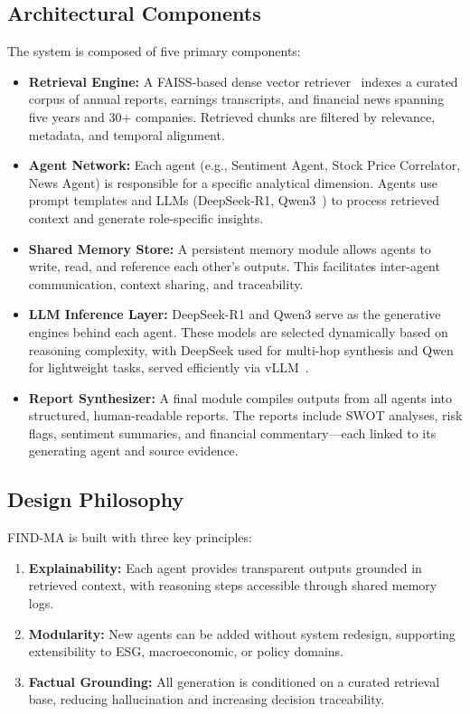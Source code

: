 \documentclass[11pt]{article}
\newcommand{\findma}{\textsc{FIND-MA}}
\begin{document}
\subsection*{Architectural Components}
The system is composed of five primary components:
\begin{itemize}
    \item \textbf{Retrieval Engine:} A FAISS-based dense vector retriever~\citep{johnson2017faiss} indexes a curated corpus of annual reports, earnings transcripts, and financial news spanning five years and 30+ companies. Retrieved chunks are filtered by relevance, metadata, and temporal alignment.
    \item \textbf{Agent Network:} Each agent (e.g., Sentiment Agent, Stock Price Correlator, News Agent) is responsible for a specific analytical dimension. Agents use prompt templates and LLMs (DeepSeek-R1, Qwen3~\citep{yang2024qwen2}) to process retrieved context and generate role-specific insights.
    \item \textbf{Shared Memory Store:} A persistent memory module allows agents to write, read, and reference each other’s outputs. This facilitates inter-agent communication, context sharing, and traceability.
    \item \textbf{LLM Inference Layer:} DeepSeek-R1 and Qwen3 serve as the generative engines behind each agent. These models are selected dynamically based on reasoning complexity, with DeepSeek used for multi-hop synthesis and Qwen for lightweight tasks, served efficiently via vLLM~\citep{kwon2023vllm}.
    \item \textbf{Report Synthesizer:} A final module compiles outputs from all agents into structured, human-readable reports. The reports include SWOT analyses, risk flags, sentiment summaries, and financial commentary—each linked to its generating agent and source evidence.
\end{itemize}

\subsection*{Design Philosophy}
\findma{} is built with three key principles:
\begin{enumerate}
    \item \textbf{Explainability:} Each agent provides transparent outputs grounded in retrieved context, with reasoning steps accessible through shared memory logs.
    \item \textbf{Modularity:} New agents can be added without system redesign, supporting extensibility to ESG, macroeconomic, or policy domains.
    \item \textbf{Factual Grounding:} All generation is conditioned on a curated retrieval base, reducing hallucination and increasing decision traceability.
\end{enumerate}
\end{document}
